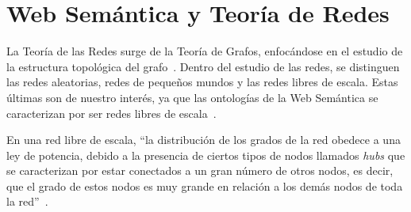 \section{Web Semántica y Teoría de Redes}
La Teoría de las Redes surge de la Teoría de Grafos, enfocándose en el estudio de la estructura topológica del grafo~\cite{solares2017redes}. Dentro del estudio de las redes, se distinguen las redes aleatorias, redes de pequeños mundos y las redes libres de escala. Estas últimas son de nuestro interés, ya que las ontologías de la Web Semántica se caracterizan por ser redes libres de escala~\cite{zhang2008scale}.

En una red libre de escala, ``la distribución de los grados de la red obedece a una ley de potencia, debido a la presencia de ciertos tipos de nodos llamados \emph{hubs} que se caracterizan por estar conectados a un gran número de otros nodos, es decir, que el grado de estos nodos es muy grande en relación a los demás nodos de toda la red''~\cite{solares2017redes}.